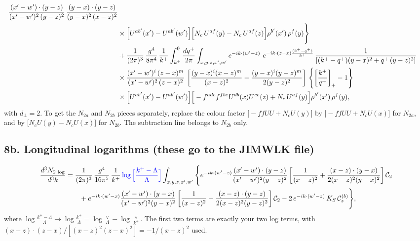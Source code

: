 \documentclass[10pt]{article}
\numberwithin{equation}{section}
\newcommand{\Cz}{\mathcal{C}^{(b)}_{z}}
\newcommand{\Wl}{\Big[U^{ab'}(x')-U^{ab'}(w')\Big]}
\begin{document}
\begin{align}
\frac{(x'-w')\cdot(y-z)}{(x'-w')^{2}\,(y-z)^{2}}\,\frac{(y-x)\cdot(y-z)}{(y-x)^{2}\,(x-z)^{2}}\notag\\
&\times\Wl\Big[N_{c}\,U^{af}(y)-N_{c}\,U^{af}(z)\Big]\rho^{b'}(x')\,\rho^{f}(y)\Bigg\}\notag \\ & + \frac{1}{(2\pi)^{3}}\,\frac{g^{4}}{8\pi^{4}}\,\frac{1}{k^{+}}\int_{k^{+}}^{0}\frac{dq^{+}}{2\pi}\int_{x,y,z,x',w'}e^{-ik\cdot(w'-z)}\ e^{-ik\cdot(z-x)\frac{(k^{+}-q^{+})}{k^{+}}}\,\frac{1}{\left[(k^{+}-q^{+})(y-x)^{2}+q^{+}\,(y-z)^{2}\right]}\notag \\ & \times\frac{(x'-w')^{i}\,(z-x)^{m}}{(x'-w')^{2}\,(z-x)^{2}}\,\left[\frac{(y-x)^{i}(x-z)^{m}}{(x-z)^{2}}-\frac{(y-x)^{i}(y-z)^{m}}{2(y-z)^{2}}\right]\,\left\{\left[\frac{k^{+}}{q^{+}}\right]_{+}-1\right\}\notag \\ & \times\Wl\Big[-f^{adc}f^{fbe}U^{db}(x)U^{ce}(z)+N_{c}\,U^{af}(y)\Big]\rho^{b'}(x')\,\rho^{f}(y),
\label{eq:finite}
\end{align}
with $d_{\perp}=2$. To get the $N_{2a}$ and $N_{2b}$ pieces separately, replace the colour factor $\big[-ffUU+N_{c}U(y)\big]$ by $\big[-ffUU+N_{c}U(x)\big]$ for $N_{2a}$, and by $\big[N_{c}U(y)-N_{c}U(x)\big]$ for $N_{2b}$. The subtraction line belongs to $N_{2b}$ only.

\subsection*{8b. Longitudinal logarithms (these go to the JIMWLK file)}
\begin{align}
\frac{d^{3}N_{2\,\log}}{d^{3}k}&=\frac{1}{(2\pi)^{3}}\,\frac{g^{4}}{16\pi^{5}}\,\frac{1}{k^{+}}\,{\color{blue}\log\Big[\frac{k^{+}-\Lambda}{\Lambda}\Big]}\int_{x,y,z,x',w'}\Bigg\{
e^{-ik\cdot(w'-z)}\frac{(x'-w')\cdot(y-z)}{(x'-w')^{2}(y-z)^{2}}\left[\frac{1}{(x-z)^{2}}+\frac{(x-z)\cdot(y-x)}{2(x-z)^{2}(y-x)^{2}}\right]\mathcal{C}_{2}\notag\\
&\qquad+e^{-ik\cdot(w'-x)}\frac{(x'-w')\cdot(y-x)}{(x'-w')^{2}(y-x)^{2}}\left[\frac{1}{(x-z)^{2}}-\frac{(x-z)\cdot(y-z)}{2(x-z)^{2}(y-z)^{2}}\right]\mathcal{C}_{2}
-2\,e^{-ik\cdot(w'-z)}\,K_{S}\,\Cz\Bigg\},
\label{eq:logs}
\end{align}
where $\log\frac{k^{+}-\Lambda}{\Lambda}\to\log\frac{k^{+}}{\Lambda}=\log\frac{\vee}{\Lambda}-\log\frac{\vee}{k^{+}}$. The first two terms are exactly your two log terms, with $(x-z)\cdot(z-x)/[(x-z)^{2}(z-x)^{2}]=-1/(x-z)^{2}$ used.
\end{document}
